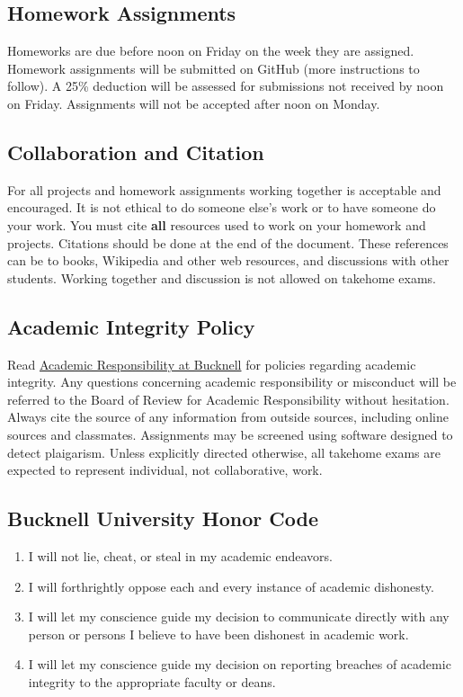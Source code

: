 \documentclass[11pt]{article} %
\begin{document}
  \subsection{Homework Assignments}
  
    Homeworks are due before noon on Friday on the week they are assigned.
    Homework assignments will be submitted on GitHub (more instructions to follow).
    A 25\% deduction will be assessed for submissions not received by noon on Friday. Assignments will not be accepted after noon on Monday.
  
  \subsection{Collaboration and Citation}
  
    For all projects and homework assignments working together is acceptable and encouraged. 
    It is not ethical to do someone else's work or to have someone do your work. 
    You must cite \textbf{all} resources used to work on your homework and projects. 
    Citations should be done at the end of the document. 
    These references can be to books, Wikipedia and other web resources, and discussions with other students. 
    Working together and discussion is not allowed on takehome exams.
  
  \subsection{Academic Integrity Policy}
  
    Read \href{"http://www.bucknell.edu/AcademicResponsibility.xml"}{Academic Responsibility at Bucknell} for policies regarding academic integrity. Any questions concerning academic responsibility or misconduct will be referred to the Board of Review for Academic Responsibility without hesitation. Always cite the source of any information from outside sources, including online sources and classmates. Assignments may be screened using software designed to detect plaigarism. Unless explicitly directed otherwise, all takehome exams are expected to represent individual, not collaborative, work.
  
  \subsection{Bucknell University Honor Code}
  \begin{enumerate}
  \item I will not lie, cheat, or steal in my academic endeavors.
  \item I will forthrightly oppose each and every instance of academic dishonesty.
  \item I will let my conscience guide my decision to communicate directly with any person or persons I believe to have been dishonest in academic work.
  \item I will let my conscience guide my decision on reporting breaches of academic integrity to the appropriate faculty or deans.
\end{enumerate}
\end{document}
